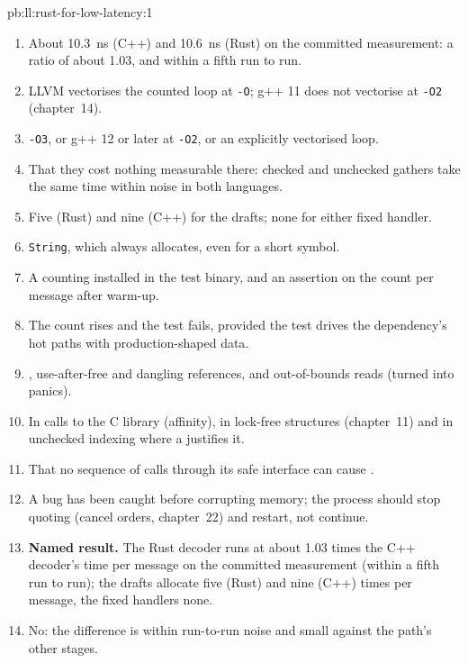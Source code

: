 \begin{solution}{pb:ll:rust-for-low-latency:1}
\begin{enumerate}
\item About \qty{10.3}{\nano\second} (C++) and \qty{10.6}{\nano\second} (Rust) on the committed measurement: a ratio of about
1.03, and within a fifth run to run.
\item LLVM vectorises the counted loop at \texttt{-O}; g++ 11 does not vectorise at \texttt{-O2} (chapter~14).
\item \texttt{-O3}, or g++ 12 or later at \texttt{-O2}, or an explicitly vectorised loop.
\item That they cost nothing measurable there: checked and unchecked gathers take the same time within noise in both
languages.
\item Five (Rust) and nine (C++) for the drafts; none for either fixed handler.
\item \texttt{String}, which always allocates, even for a short symbol.
\item A counting  installed in the test binary, and an assertion on the count per message after warm-up.
\item The count rises and the test fails, provided the test drives the dependency's hot paths with production-shaped data.
\item {}, use-after-free and dangling references, and out-of-bounds reads (turned into panics).
\item In calls to the C library (affinity), in lock-free structures (chapter~11) and in unchecked indexing where a  justifies it.
\item That no sequence of calls through its safe interface can cause .
\item A bug has been caught before corrupting memory; the process should stop quoting (cancel orders, chapter~22) and
restart, not continue.
\item \textbf{Named result.} The Rust decoder runs at about 1.03 times the C++ decoder's time per message on the committed
measurement (within a fifth run to run); the drafts allocate five (Rust) and nine (C++) times per message, the fixed
handlers none.
\item No: the difference is within run-to-run noise and small against the path's other stages.

\end{enumerate}
\end{solution}
